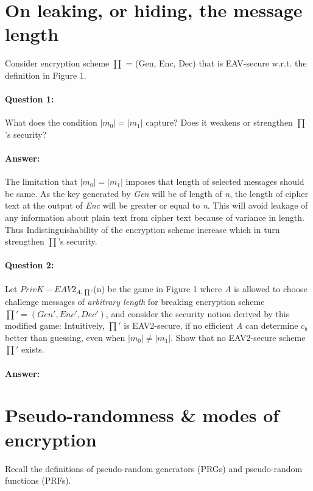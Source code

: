 \documentclass{article}
\begin{document}
\section{On leaking, or hiding, the message length}
    Consider encryption scheme $\prod$ = (Gen, Enc, Dec) that is EAV-secure w.r.t. the definition in Figure 1.
    
    \paragraph{Question 1:} What does the condition $|m_0| = |m_1|$ capture? Does it weakens or strengthen $\prod$'s security?
    \paragraph{Answer: \newline}
        The limitation that $|m_0| = |m_1|$ imposes that length of selected messages should be same. As the key generated by \emph{Gen} will be of length of \emph{n}, the length of cipher text at the output of \emph{Enc} will be greater or equal to \emph{n}. \newline
        This will avoid leakage of any information about plain text from cipher text because of variance in length. Thus Indistinguishability of the encryption scheme increase which in turn strengthen $\prod$'s security.
        
    \paragraph{Question 2:} Let $PrivK-EAV2_{A,\prod'}$(n) be the game in Figure 1 where \emph{A} is allowed to choose challenge messages of \emph{arbitrary length} for breaking encryption scheme $\prod' = (Gen',Enc',Dec')$, and consider the security notion derived by this modified game: Intuitively, $\prod'$ is EAV2-secure, if no efficient \emph{A} can determine $c_b$ better than guessing, even when $|m_0| \neq |m_1|$. Show that no EAV2-secure scheme $\prod'$ exists.
    \paragraph{Answer: \newline}
    
\section{Pseudo-randomness \& modes of encryption}
    Recall the definitions of pseudo-random generators (PRGs) and pseudo-random functions (PRFs).
    
\end{document}
